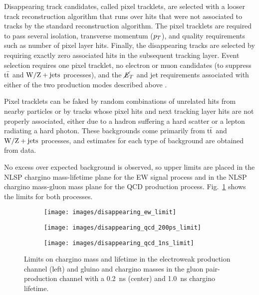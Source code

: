 \documentclass[12pt]{article}
\begin{document}
        Disappearing track candidates, called pixel tracklets, are selected with a looser track reconstruction algorithm that runs over hits that were not associated to tracks by the standard reconstruction algorithm. The pixel tracklets are required to pass several isolation, transverse momentum ($p_T$), and quality requirements such as number of pixel layer hits. Finally, the disappearing tracks are selected by requiring exactly zero associated hits in the subsequent tracking layer. Event selection requires one pixel tracklet, no electron or muon candidates (to suppress $\mathrm{t}\bar{\mathrm{t}}$ and $\mathrm{W}/\mathrm{Z} + \mathrm{jets}$ processes), and the $\cancel{\it{E}}_{T}$ and jet requirements associated with either of the two production modes described above .
        
        Pixel tracklets can be faked by random combinations of unrelated hits from nearby particles or by tracks whose pixel hits and next tracking layer hits are not properly associated, either due to a hadron suffering a hard scatter or a lepton radiating a hard photon. These backgrounds come primarily from $\mathrm{t}\bar{\mathrm{t}}$ and $\mathrm{W}/\mathrm{Z} + \mathrm{jets}$ processes, and estimates for each type of background are obtained from data. 

        No excess over expected background is observed, so upper limits are placed in the NLSP chargino mass-lifetime plane for the EW signal process and in the NLSP chargino mass-gluon mass plane for the QCD production process. Fig.~\ref{disappearing_limits} shows the limits for both processes.

        \noindent \begin{figure}[htbp] \begin{center}
        \begin{subfigure}[htbp]{0.3\textwidth} \begin{center}
        \texttt{[image: images/disappearing\_ew\_limit]}
        \end{center} \end{subfigure}
        \begin{subfigure}[htbp]{0.3\textwidth} \begin{center}
        \texttt{[image: images/disappearing\_qcd\_200ps\_limit]}
        \end{center} \end{subfigure}
        \begin{subfigure}[htbp]{0.3\textwidth} \begin{center}
        \texttt{[image: images/disappearing\_qcd\_1ns\_limit]}
        \end{center} \end{subfigure}
            \caption{Limits on chargino mass and lifetime in the electroweak production channel (left) and gluino and chargino masses in the gluon pair-production channel with a \SI{0.2}{\nano\s} (center) and \SI{1.0}{\nano\s} chargino lifetime.~\cite{atlas_disappearing}}
        \label{disappearing_limits}
        \end{center} \end{figure}
\end{document}
